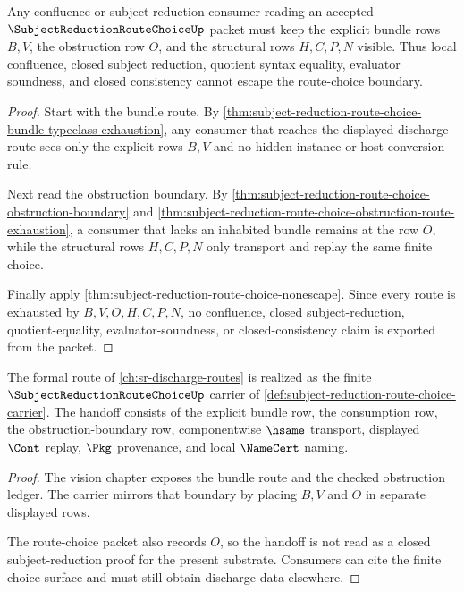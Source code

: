 \begin{theorem}
\label{thm:subject-reduction-route-choice-confluence-nonescape}
Any confluence or subject-reduction consumer reading an accepted $\SubjectReductionRouteChoiceUp$ packet must keep the explicit bundle rows $B,V$, the obstruction row $O$, and the structural rows $H,C,P,N$ visible. Thus local confluence, closed subject reduction, quotient syntax equality, evaluator soundness, and closed consistency cannot escape the route-choice boundary.
\end{theorem}
\begin{proof}
Start with the bundle route. By \autoref{thm:subject-reduction-route-choice-bundle-typeclass-exhaustion}, any consumer that reaches the displayed discharge route sees only the explicit rows $B,V$ and no hidden instance or host conversion rule.

Next read the obstruction boundary. By \autoref{thm:subject-reduction-route-choice-obstruction-boundary} and \autoref{thm:subject-reduction-route-choice-obstruction-route-exhaustion}, a consumer that lacks an inhabited bundle remains at the row $O$, while the structural rows $H,C,P,N$ only transport and replay the same finite choice.

Finally apply \autoref{thm:subject-reduction-route-choice-nonescape}. Since every route is exhausted by $B,V,O,H,C,P,N$, no confluence, closed subject-reduction, quotient-equality, evaluator-soundness, or closed-consistency claim is exported from the packet.
\end{proof}

\begin{theorem}
\label{thm:subject-reduction-route-choice-vision-handoff}
The formal route of \autoref{ch:sr-discharge-routes} is realized as the finite $\SubjectReductionRouteChoiceUp$ carrier of \autoref{def:subject-reduction-route-choice-carrier}. The handoff consists of the explicit bundle row, the consumption row, the obstruction-boundary row, componentwise $\hsame$ transport, displayed $\Cont$ replay, $\Pkg$ provenance, and local $\NameCert$ naming.
\end{theorem}
\begin{proof}
The vision chapter exposes the bundle route and the checked obstruction ledger. The carrier mirrors that boundary by placing $B,V$ and $O$ in separate displayed rows.

The route-choice packet also records $O$, so the handoff is not read as a closed subject-reduction proof for the present substrate. Consumers can cite the finite choice surface and must still obtain discharge data elsewhere.
\end{proof}

